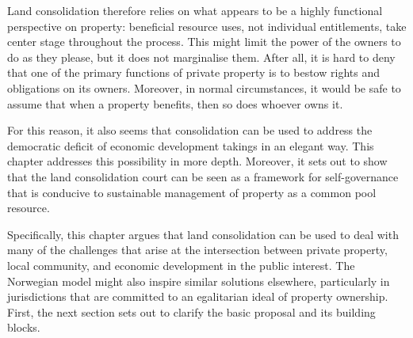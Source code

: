 Land consolidation therefore relies on what appears to be a highly functional perspective on property: beneficial resource uses, not individual entitlements, take center stage throughout the process. This might limit the power of the owners to do as they please, but it does not marginalise them. After all, it is hard to deny that one of the primary functions of private property is to bestow rights and obligations on its owners. Moreover, in normal circumstances, it would be safe to assume that when a property benefits, then so does whoever owns it.

For this reason, it also seems that consolidation can be used to address the democratic deficit of economic development takings in an elegant way. This chapter addresses this possibility in more depth. Moreover, it sets out to show that the land consolidation court can be seen as a framework for self-governance that is conducive to sustainable management of property as a common pool resource. 




Specifically, this chapter argues that land consolidation can be used to deal with many of the challenges that arise at the intersection between private property, local community, and economic development in the public interest. The Norwegian model might also inspire similar solutions elsewhere, particularly in jurisdictions that are committed to an egalitarian ideal of property ownership. First, the next section sets out to clarify the basic proposal and its building blocks.

